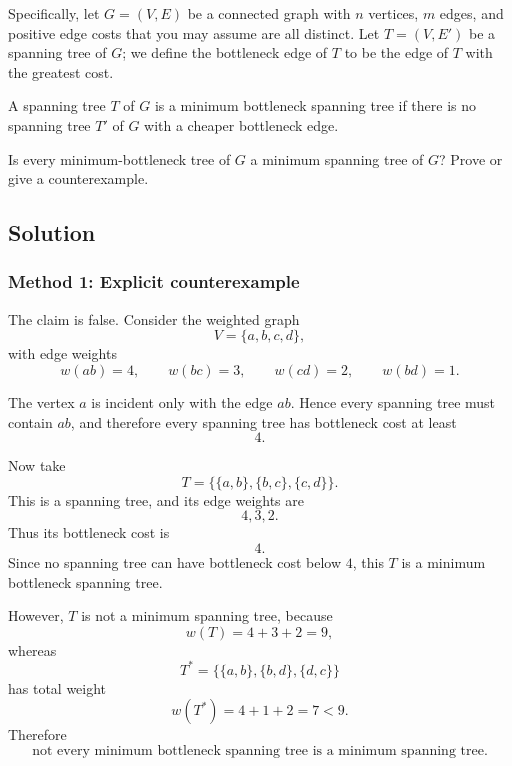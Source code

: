\documentclass[12pt]{article}
\begin{document}
Specifically, let $G=(V,E)$ be a connected graph with $n$ vertices, $m$ edges, and positive edge costs that you may assume are all distinct. Let $T=(V,E')$ be a spanning tree of $G$; we define the bottleneck edge of $T$ to be the edge of $T$ with the greatest cost.

A spanning tree $T$ of $G$ is a minimum bottleneck spanning tree if there is no spanning tree $T'$ of $G$ with a cheaper bottleneck edge.

Is every minimum-bottleneck tree of $G$ a minimum spanning tree of $G$? Prove or give a counterexample.

\subsection{Solution}

\subsubsection{Method 1: Explicit counterexample}
The claim is false. Consider the weighted graph
\[
  V=\{a,b,c,d\},
\]
with edge weights
\[
  w(ab)=4,\qquad w(bc)=3,\qquad w(cd)=2,\qquad w(bd)=1.
\]

\begin{center}
\end{center}

The vertex $a$ is incident only with the edge $ab$. Hence every spanning tree must contain $ab$, and therefore every spanning tree has bottleneck cost at least
\[
  4.
\]

Now take
\[
  T=\{\{a,b\},\{b,c\},\{c,d\}\}.
\]
This is a spanning tree, and its edge weights are
\[
  4,3,2.
\]
Thus its bottleneck cost is
\[
  4.
\]
Since no spanning tree can have bottleneck cost below $4$, this $T$ is a minimum bottleneck spanning tree.

However, $T$ is not a minimum spanning tree, because
\[
  w(T)=4+3+2=9,
\]
whereas
\[
  T^*=\{\{a,b\},\{b,d\},\{d,c\}\}
\]
has total weight
\[
  w(T^*)=4+1+2=7<9.
\]
Therefore
\[
  \boxed{\text{not every minimum bottleneck spanning tree is a minimum spanning tree}.}
\]
\end{document}
